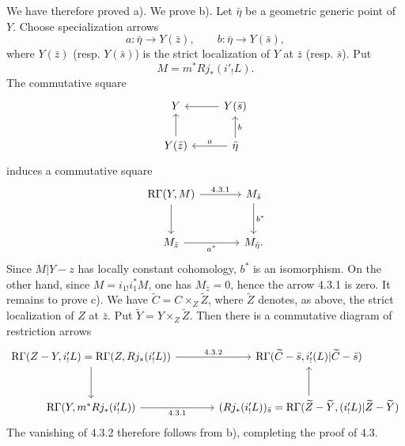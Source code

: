 We have therefore proved a). We prove b). Let $\bar\eta$ be a geometric generic point of $Y$. Choose specialization arrows
\[
a:\bar\eta\to Y(\bar z),\qquad b:\bar\eta\to Y(\bar s),
\]
where $Y(\bar z)$ (resp. $Y(\bar s)$) is the strict localization of $Y$ at $\bar z$ (resp. $\bar s$). Put
\[
M=m^*Rj_*(i'_!L).
\]
The commutative square
\[
\begin{tikzcd}
Y & Y(\bar s) \arrow[l]\\
Y(\bar z) \arrow[u] & \bar\eta \arrow[l,"a"'] \arrow[u,"b"']
\end{tikzcd}
\]
induces a commutative square
\[
\begin{tikzcd}[column sep=large,row sep=large]
\mathrm R\Gamma(Y,M) \arrow[r,"4.3.1"] \arrow[d] & M_{\bar s} \arrow[d,"b^*"]\\
M_{\bar z} \arrow[r,"a^*"'] & M_{\bar\eta}.
\end{tikzcd}
\]
Since $M|Y-z$ has locally constant cohomology, $b^*$ is an isomorphism. On the other hand, since $M=i_{1!}i_1^*M$, one has $M_{\bar z}=0$, hence the arrow 4.3.1 is zero. It remains to prove c). We have $\widetilde C=C\times_Z\widetilde Z$, where $\widetilde Z$ denotes, as above, the strict localization of $Z$ at $\bar z$. Put $\widetilde Y=Y\times_Z\widetilde Z$. Then there is a commutative diagram of restriction arrows
\[
\begin{tikzcd}[column sep=large,row sep=large]
\mathrm R\Gamma(Z-Y,i'_!L)=\mathrm R\Gamma(Z,Rj_*(i'_!L))
 \arrow[r,"4.3.2"] \arrow[d]
&
\mathrm R\Gamma(\widetilde C-\bar s,i'_!(L)|\widetilde C-\bar s)\\
\mathrm R\Gamma(Y,m^*Rj_*(i'_!L)) \arrow[r,"4.3.1"']
&
(Rj_*(i'_!L))_{\bar s}
  =\mathrm R\Gamma(\widetilde Z-\widetilde Y,(i'_!L)|\widetilde Z-\widetilde Y) \arrow[u]
\end{tikzcd}
\]
The vanishing of 4.3.2 therefore follows from b), completing the proof of 4.3.

